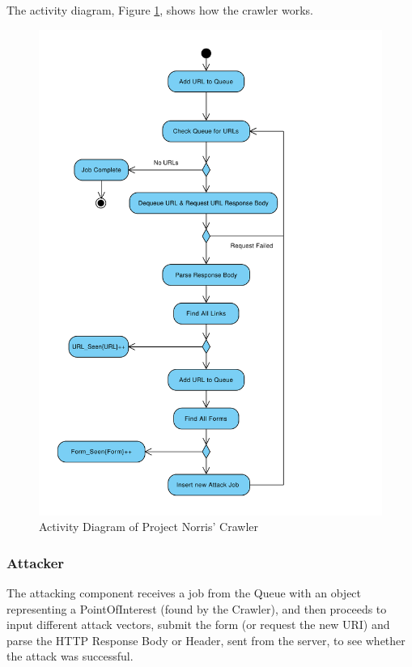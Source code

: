 \documentclass[12pt,a4paper]{article}
\begin{document}
The activity diagram, Figure \ref{fig:crawler}, shows how the crawler works.

\begin{figure}[!ht]
    \begin{center}
        \includegraphics[scale=0.4]{images/crawler_activity_diagram.pdf}    
    \end{center}
    \caption{Activity Diagram of Project Norris' Crawler}
    \label{fig:crawler}
\end{figure}

\subsubsection{Attacker}
The attacking component receives a job from the Queue with an object representing a PointOfInterest (found by the Crawler), and then proceeds to input different attack vectors, submit the form (or request the new URI) and parse the HTTP Response Body or Header, sent from the server, to see whether the attack was successful.
\end{document}
